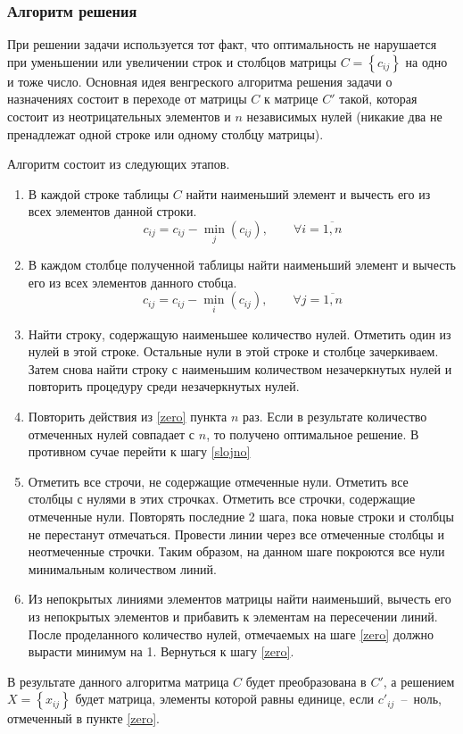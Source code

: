 \documentclass[14pt,a4paper]{extarticle}
\begin{document}
\subsubsection*{Алгоритм решения}
При решении задачи используется тот факт, что оптимальность не нарушается при уменьшении или увеличении строк и столбцов матрицы $C = \left\{c_{ij}\right\}$ на одно и тоже число. Основная идея венгреского алгоритма решения задачи о назначениях состоит в переходе от матрицы $C$ к матрице $C'$ такой, которая состоит из неотрицательных элементов и $n$ независимых нулей (никакие два не пренадлежат одной строке или одному столбцу матрицы). 

Алгоритм состоит из следующих этапов.
\begin{enumerate}

\item В каждой строке таблицы $C$ найти наименьший элемент и вычесть его из всех элементов данной строки.
\begin{equation}
c_{ij} = c_{ij} - \min_j (c_{ij}), \qquad \forall i = \overline{1,n}
\end{equation}

\item В каждом столбце полученной таблицы найти наименьший элемент и вычесть его из всех элементов данного стобца.
\begin{equation}
c_{ij} = c_{ij} - \min_i (c_{ij}), \qquad \forall j = \overline{1,n}
\end{equation}

\item \label{zero} Найти строку, содержащую наименьшее количество нулей. Отметить один из нулей в этой строке. Остальные нули в этой строке и столбце зачеркиваем. Затем снова найти строку с наименьшим количеством незачеркнутых нулей и повторить процедуру среди незачеркнутых нулей.
\item Повторить действия из \ref{zero} пункта $n$ раз. Если в результате количество отмеченных нулей совпадает с $n$, то получено оптимальное решение. В противном сучае перейти к шагу \ref{slojno}

\item \label{slojno} Отметить все строчи, не содержащие отмеченные нули. Отметить все столбцы с нулями в этих строчках. Отметить все строчки, содержащие отмеченные нули. Повторять последние 2 шага, пока новые строки и столбцы не перестанут отмечаться. Провести линии через все отмеченные столбцы и неотмеченные строчки. Таким образом, на данном шаге покроются все нули минимальным количеством линий.

\item Из непокрытых линиями элементов матрицы найти наименьший, вычесть его из непокрытых элементов и прибавить к элементам на пересечении линий. После проделанного количество нулей, отмечаемых на шаге \ref{zero} должно вырасти минимум на 1. Вернуться к шагу \ref{zero}.
\end{enumerate}
В результате данного алгоритма матрица $C$ будет преобразована в $C'$, а решением $X = \left\{x_{ij}\right\}$ будет матрица, элементы которой равны единице, если $c'_{ij}$~--~ноль, отмеченный в пункте \ref{zero}.
\end{document}
